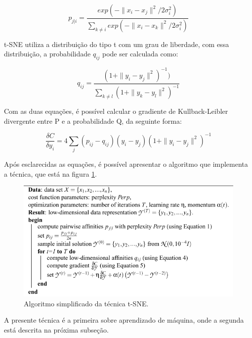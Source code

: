 \begin{equation}\label{eq:t-sne_1}
    p_{j|i}=\frac{exp(-\parallel x_i-x_j\parallel^2/2\sigma_i^2)}{\sum_{k\ne i}{exp(-\parallel x_i-x_k\parallel^2/2\sigma_i^2)}}
\end{equation}

t-SNE utiliza a distribuição do tipo t com um grau de liberdade, com essa distribuição, a probabilidade $q_{ij}$ pode ser calculada como:

\begin{equation}\label{eq:t-sne_4}
    q_{ij}=\frac{(1+\parallel y_i-y_j\parallel^2)^{-1})}{\sum_{k\ne l}{(1 + \parallel y_k-y_l\parallel^2)^{-1}}}
\end{equation}

Com as duas equações, é possível calcular o gradiente de Kullback-Leibler  divergente entre P e a probabilidade Q, da seguinte forma:

\begin{equation}\label{eq:t-sne_5}
    \frac{\delta C}{\delta y_i} = 4 \sum_j{(p_{ij}-q_{ij})(y_i - y_j)(1+\parallel y_i-y_j\parallel^2)^{-1}}
\end{equation}

Após esclarecidas as equações, é possível apresentar o algoritmo que implementa a técnica, que está na figura \ref{fig:t-sne_algorithm_maaten_p9}.
\begin{figure}[H]
    \caption{Algoritmo simplificado da técnica t-SNE.}
    \begin{center}
        \includegraphics[scale=.45]{referencial/img/t-sne_algorithm_maaten_p9.png}
    \end{center}
    \label{fig:t-sne_algorithm_maaten_p9}
\end{figure}

A presente técnica é a primeira sobre aprendizado de máquina, onde a segunda está descrita na próxima subseção.


